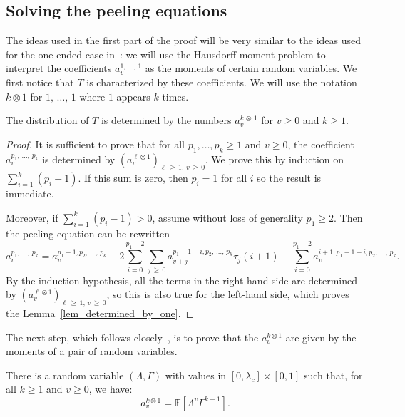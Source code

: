 \documentclass[AHL,Unicode,longabstracts,published]{cedram}
\newcommand{\E}{\mathbb{E}}
\begin{document}
\subsection{Solving the peeling equations}\label{subsec_solve_peeling}

The ideas used in the first part of the proof will be very similar to the ideas used for the one-ended case in~\cite[Section~3]{BL19}: we will use the Hausdorff moment problem to interpret the coefficients $a_v^{1,\,\dots,\,1}$ as the moments of certain random variables. We first notice that $T$ is characterized by these coefficients. We will use the notation $k \otimes 1$ for $1,\,\dots,\,1$ where $1$ appears $k$ times.

\begin{lemm}\label{lem_determined_by_one}
The distribution of $T$ is determined by the numbers $a_v^{k\,\otimes\,1}$ for $v \geq 0$ and $k \geq 1$.
\end{lemm}

\begin{proof}
It is sufficient to prove that for all $p_1, \dots, p_k \geq 1$ and $v \geq 0$, the coefficient $a_v^{p_1,\,\dots,\,p_k}$ is determined by $(a_v^{\ell \otimes 1})_{\ell\,\geq\,1, \, v\,\geq\,0}$. We prove this by induction on $\sum_{i=1}^k (p_i-1)$. If this sum is zero, then $p_i=1$ for all $i$ so the result is immediate.

Moreover, if $\sum_{i=1}^k (p_i-1)>0$, assume without loss of generality $p_1 \geq 2$. Then the peeling equation can be rewritten
\[
a_v^{p_1,\,\dots,\,p_k} = a_v^{p_1-1, p_2,\,\dots,\, p_k} -2 \sum_{i=0}^{p_1-2} \sum_{j\,\geq\,0} a_{v+j}^{p_1-1-i, p_2,\,\dots,\,p_k} \tau_j(i+1) - \sum_{i=0}^{p_1-2} a_v^{i+1, p_1-1-i,p_2,\,\dots,\, p_k}.
\]
By the induction hypothesis, all the terms in the right-hand side are determined by $(a_v^{\ell \otimes 1})_{\ell\,\geq\,1, \, v\,\geq\,0}$, so this is also true for the left-hand side, which proves the Lemma~\ref{lem_determined_by_one}.
\end{proof}

The next step, which follows closely~\cite[Section~3]{BL19}, is to prove that the $a_v^{k \otimes 1}$ are given by the moments of a pair of random variables.

\begin{lemm}\label{lem_apv_as_moments}
There is a random variable $\left(\Lambda, \Gamma \right)$ with values in $[0, \lambda_c] \times [0,1]$ such that, for all $k \geq 1$ and $v \geq 0$, we have:
\begin{equation}\label{eqn_apv_as_moments}
a_v^{k \otimes 1} = \E \left[\Lambda^{v} \Gamma^{k-1} \right].
\end{equation}
\end{lemm}
\end{document}
